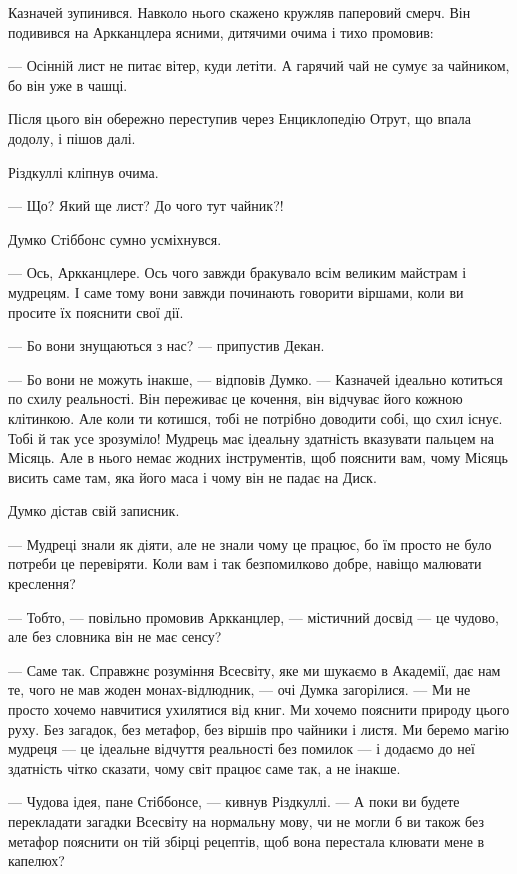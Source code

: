 \documentclass[12pt, a4paper, openany]{book}
\begin{document}
\begin{terrybox}
Казначей зупинився. Навколо нього скажено кружляв паперовий смерч. Він подивився на Аркканцлера ясними, дитячими очима і тихо промовив:

--- Осінній лист не питає вітер, куди летіти. А гарячий чай не сумує за чайником, бо він уже в чашці.

Після цього він обережно переступив через Енциклопедію Отрут, що впала додолу, і пішов далі.

Різдкуллі кліпнув очима.

--- Що? Який ще лист? До чого тут чайник?!

Думко Стіббонс сумно усміхнувся.

--- Ось, Аркканцлере. Ось чого завжди бракувало всім великим майстрам і мудрецям. І саме тому вони завжди починають говорити віршами, коли ви просите їх пояснити свої дії.

--- Бо вони знущаються з нас? --- припустив Декан.

--- Бо вони не можуть інакше, --- відповів Думко. --- Казначей ідеально котиться по схилу реальності. Він переживає це кочення, він відчуває його кожною клітинкою. Але коли ти котишся, тобі не потрібно доводити собі, що схил існує. Тобі й так усе зрозуміло! Мудрець має ідеальну здатність вказувати пальцем на Місяць. Але в нього немає жодних інструментів, щоб пояснити вам, чому Місяць висить саме там, яка його маса і чому він не падає на Диск.

Думко дістав свій записник.

--- Мудреці знали як діяти, але не знали чому це працює, бо їм просто не було потреби це перевіряти. Коли вам і так безпомилково добре, навіщо малювати креслення?

--- Тобто, --- повільно промовив Аркканцлер, --- містичний досвід --- це чудово, але без словника він не має сенсу?

--- Саме так. Справжнє розуміння Всесвіту, яке ми шукаємо в Академії, дає нам те, чого не мав жоден монах-відлюдник, --- очі Думка загорілися. --- Ми не просто хочемо навчитися ухилятися від книг. Ми хочемо пояснити природу цього руху. Без загадок, без метафор, без віршів про чайники і листя. Ми беремо магію мудреця --- це ідеальне відчуття реальності без помилок --- і додаємо до неї здатність чітко сказати, чому світ працює саме так, а не інакше.

--- Чудова ідея, пане Стіббонсе, --- кивнув Різдкуллі. --- А поки ви будете перекладати загадки Всесвіту на нормальну мову, чи не могли б ви також без метафор пояснити он тій збірці рецептів, щоб вона перестала клювати мене в капелюх?
\end{terrybox}
\end{document}
